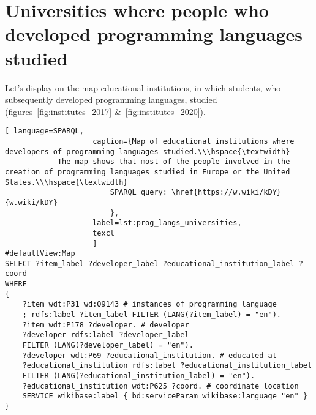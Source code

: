 \section{Universities where people who developed programming languages studied}
Let's display on the map educational institutions, in which students, who subsequently developed programming languages, studied (figures~\ref{fig:institutes_2017} \&~\ref{fig:institutes_2020}).
\begin{lstlisting}[ language=SPARQL, 
                    caption={Map of educational institutions where developers of programming languages studied.\\\hspace{\textwidth}
			The map shows that most of the people involved in the creation of programming languages studied in Europe or the United States.\\\hspace{\textwidth}
                        SPARQL query: \href{https://w.wiki/kDY}{w.wiki/kDY}
                        },
                    label=lst:prog_langs_universities,
                    texcl 
                    ]
#defaultView:Map
SELECT ?item_label ?developer_label ?educational_institution_label ?coord
WHERE
{
	?item wdt:P31 wd:Q9143 # instances of programming language
	; rdfs:label ?item_label FILTER (LANG(?item_label) = "en"). 
	?item wdt:P178 ?developer. # developer
	?developer rdfs:label ?developer_label
	FILTER (LANG(?developer_label) = "en"). 
	?developer wdt:P69 ?educational_institution. # educated at
	?educational_institution rdfs:label ?educational_institution_label
	FILTER (LANG(?educational_institution_label) = "en").
	?educational_institution wdt:P625 ?coord. # coordinate location
	SERVICE wikibase:label { bd:serviceParam wikibase:language "en" } 	
}
\end{lstlisting}%

\label{question:prog_lang_3}

